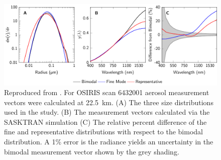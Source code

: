 \begin{figure}
\centering
\includegraphics[width=1.0\textwidth]{./Images/5-4-AerosolMeasurementParticleSizeInfo.pdf}
    \caption[Aerosol Measurement Vectors Sensitivity to Particle Size]{Reproduced from \citep{Rieger2014}. For OSIRIS scan 6432001 aerosol measurement vectors were calculated at 22.5~km. (A) The three size distributions used in the study. (B) The measurement vectors calculated via the SASKTRAN simulation (C) The relative percent difference of the fine and representative distributions with respect to the bimodal distribution. A 1\% error is the radiance yields an uncertainty in the bimodal measurement vector shown by the grey shading.}
    \label{fig:5.4:AerosolMeasurementParticleSizeInfo}
\end{figure}

